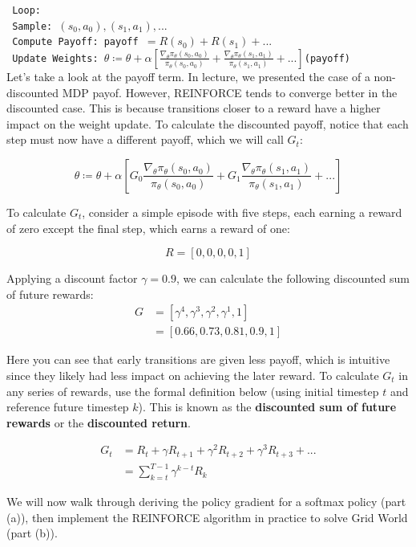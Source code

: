 {\tt
Loop:\\
\-\ Sample: $(s_0, a_0), (s_1, a_1),...$\\
\-\ Compute Payoff: payoff $=R(s_0)+R(s_1)+...$\\
\-\ Update Weights: $\theta\coloneqq\theta+\alpha\left[\frac{\nabla_\theta\pi_\theta(s_0,a_0)}{\pi_\theta(s_0,a_0)}+\frac{\nabla_\theta\pi_\theta(s_1,a_1)}{\pi_\theta(s_1,a_1)}+...\right]$(payoff)}\\

Let's take a look at the payoff term.  In lecture, we presented the case of a non-discounted MDP payof.  However, REINFORCE tends to converge better in the discounted case.  This is because transitions closer to a reward have a higher impact on the weight update.  To calculate the discounted payoff, notice that each step must now have a different payoff, which we will call $G_t$:

$$\theta\coloneqq\theta+\alpha\left[G_0\frac{\nabla_\theta\pi_\theta(s_0,a_0)}{\pi_\theta(s_0,a_0)}+G_1\frac{\nabla_\theta\pi_\theta(s_1,a_1)}{\pi_\theta(s_1,a_1)}+...\right]$$

To calculate $G_t$, consider a simple episode with five steps, each earning a reward of zero except the final step, which earns a reward of one:

$$R=\left[0,0,0,0,1\right]$$

Applying a discount factor $\gamma=0.9$, we can calculate the following discounted sum of future rewards:
\begin{align*}
G&=\left[\gamma^4, \gamma^3, \gamma^2, \gamma^1, 1\right]\\
 &=\left[0.66, 0.73, 0.81, 0.9, 1\right]
\end{align*}

Here you can see that early transitions are given less payoff, which is intuitive since they likely had less impact on achieving the later reward.  To calculate $G_t$ in any series of rewards, use the formal definition below (using initial timestep $t$ and reference future timestep $k$).  This is known as the {\bf discounted sum of future rewards} or the {\bf discounted return}.

\begin{align*}
    G_t &= R_t + \gamma R_{t+1} + \gamma^2 R_{t+2} + \gamma^3 R_{t+3} + ...\\
    &=\sum^{T-1}_{k=t}\gamma^{k-t}R_k
\end{align*}

We will now walk through deriving the policy gradient for a softmax policy (part (a)), then implement the REINFORCE algorithm in practice to solve Grid World (part (b)).

\begin{enumerate}
  

  

\end{enumerate}

